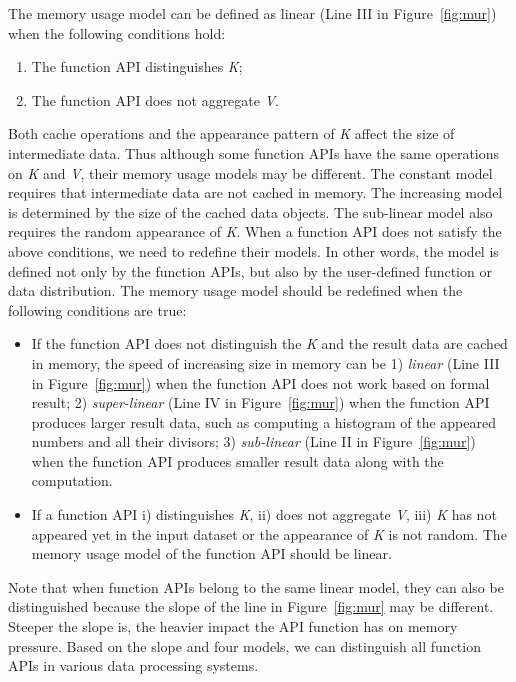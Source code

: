 \begin{lemma}[Linear] The memory usage model can be defined as linear (Line III in Figure~\ref{fig:mur}) when the following conditions hold:
\begin{enumerate}
\item The function API distinguishes \textit{K};
\item The function API does not aggregate \textit{V}.
\end{enumerate}
\end{lemma}

Both cache operations and the appearance pattern of \textit{K} affect the  size of intermediate data. Thus although some function APIs have the same operations on \textit{K} and \textit{V}, their memory usage models may be different. The constant model requires that intermediate data are not cached in memory. The increasing model is determined by the size of the cached data objects. The sub-linear model also requires the random appearance of \textit{K}. When a function API does not satisfy the above conditions, we need to redefine their models. In other words, the model is defined not only by the function APIs, but also by the user-defined function or data distribution. The memory usage model should be redefined when the following conditions are true:

\begin{itemize}

\item If the function API does not distinguish the \textit{K} and the result data are cached in memory, the speed of increasing size in memory can be 1) \textit{linear} (Line III in Figure~\ref{fig:mur}) when the function API does not work based on formal result; 2) \textit{super-linear} (Line IV in Figure~\ref{fig:mur}) when the function API produces larger result data, such as computing a histogram of the appeared numbers and all their divisors; 3) \textit{sub-linear} (Line II in Figure~\ref{fig:mur}) when the function API produces smaller result data along with the computation. 

\item If a function API i) distinguishes \textit{K}, ii) does not aggregate \textit{V}, iii) \textit{K} has not appeared yet in the input dataset or the appearance of \textit{K} is not random. The memory usage model of the function API should be linear.

\end{itemize}

Note that when function APIs belong to the same linear model, they can also be distinguished because the slope of the line in Figure~\ref{fig:mur} may be different. Steeper the slope is, the heavier impact the API function has on memory pressure. Based on the slope and four models, we can distinguish all function APIs in various data processing systems.

